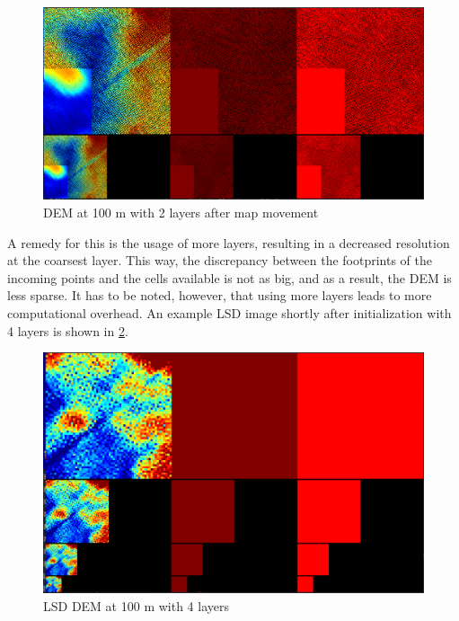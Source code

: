 \begin{figure}[h]
\centering
\includegraphics[scale=0.24]{images/evaluation/LSD_layer_analysis/2_layers_3.png}
\caption{DEM at 100 m with 2 layers after map movement}
\label{fig:lsd_2_layers_3}
\end{figure}

A remedy for this is the usage of more layers, resulting in a decreased resolution at the coarsest layer. This way, the discrepancy between the footprints of the incoming points and the cells available is not as big, and as a result, the DEM is less sparse. It has to be noted, however, that using more layers leads to more computational overhead. An example LSD image shortly after initialization with 4 layers is shown in \cref{fig:lsd_4_layers_1}.

\begin{figure}[h]
\centering
\includegraphics[scale=0.24]{images/evaluation/LSD_layer_analysis/4_layers_1.png}
\caption{LSD DEM at 100 m with 4 layers}
\label{fig:lsd_4_layers_1}
\end{figure}

